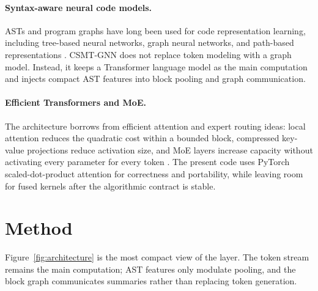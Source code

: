\documentclass[10pt]{article}
\begin{document}
\paragraph{Syntax-aware neural code models.}
ASTs and program graphs have long been used for code representation learning,
including tree-based neural networks, graph neural networks, and path-based
representations \citep{allamanis2018learning,alon2019code2vec,brockschmidt2019generative}.
CSMT-GNN does not replace token modeling with a graph model.  Instead, it keeps a
Transformer language model as the main computation and injects compact AST
features into block pooling and graph communication.

\paragraph{Efficient Transformers and MoE.}
The architecture borrows from efficient attention and expert routing ideas:
local attention reduces the quadratic cost within a bounded block, compressed
key-value projections reduce activation size, and MoE layers increase capacity
without activating every parameter for every token \citep{vaswani2017attention,
dao2022flashattention,shazeer2017outrageously,lepikhin2020gshard,fedus2022switch}.
The present code uses PyTorch scaled-dot-product attention for correctness and
portability, while leaving room for fused kernels after the algorithmic contract
is stable.

\section{Method}

Figure~\ref{fig:architecture} is the most compact view of the layer.  The token
stream remains the main computation; AST features only modulate pooling, and the
block graph communicates summaries rather than replacing token generation.
\end{document}
